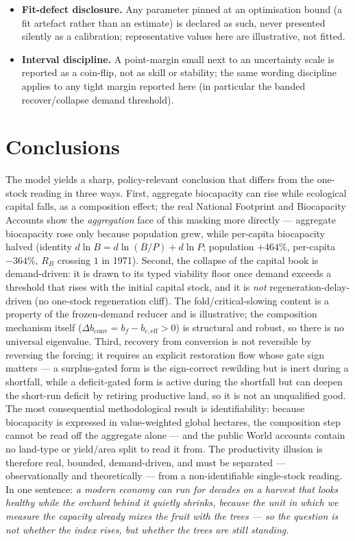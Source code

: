 \documentclass[11pt]{article}
\begin{document}
\begin{itemize}
\item \textbf{Fit-defect disclosure.} Any parameter pinned at an optimisation bound (a fit artefact rather than an estimate) is declared as such, never presented silently as a calibration; representative values here are illustrative, not fitted.
\item \textbf{Interval discipline.} A point-margin small next to an uncertainty scale is reported as a coin-flip, not as skill or stability; the same wording discipline applies to any tight margin reported here (in particular the banded recover/collapse demand threshold).
\end{itemize}

\section{Conclusions}

The model yields a sharp, policy-relevant conclusion that differs from the one-stock reading in three ways. First, aggregate biocapacity can rise while ecological capital falls, as a composition effect; the real National Footprint and Biocapacity Accounts show the \emph{aggregation} face of this masking more directly --- aggregate biocapacity rose only because population grew, while per-capita biocapacity halved (identity $d\ln B=d\ln(B/P)+d\ln P$; population $+464\%$, per-capita $-364\%$, $R_B$ crossing $1$ in 1971). Second, the collapse of the capital book is demand-driven: it is drawn to its typed viability floor once demand exceeds a threshold that rises with the initial capital stock, and it is \emph{not} regeneration-delay-driven (no one-stock regeneration cliff). The fold/critical-slowing content is a property of the frozen-demand reducer and is illustrative; the composition mechanism itself ($\Delta b_{\mathrm{conv}}=b_f-b_{c,\mathrm{eff}}>0$) is structural and robust, so there is no universal eigenvalue. Third, recovery from conversion is not reversible by reversing the forcing; it requires an explicit restoration flow whose gate sign matters --- a surplus-gated form is the sign-correct rewilding but is inert during a shortfall, while a deficit-gated form is active during the shortfall but can deepen the short-run deficit by retiring productive land, so it is not an unqualified good. The most consequential methodological result is identifiability: because biocapacity is expressed in value-weighted global hectares, the composition step cannot be read off the aggregate alone --- and the public World accounts contain no land-type or yield/area split to read it from. The productivity illusion is therefore real, bounded, demand-driven, and must be separated --- observationally and theoretically --- from a non-identifiable single-stock reading. In one sentence: \emph{a modern economy can run for decades on a harvest that looks healthy while the orchard behind it quietly shrinks, because the unit in which we measure the capacity already mixes the fruit with the trees --- so the question is not whether the index rises, but whether the trees are still standing.}
\end{document}
